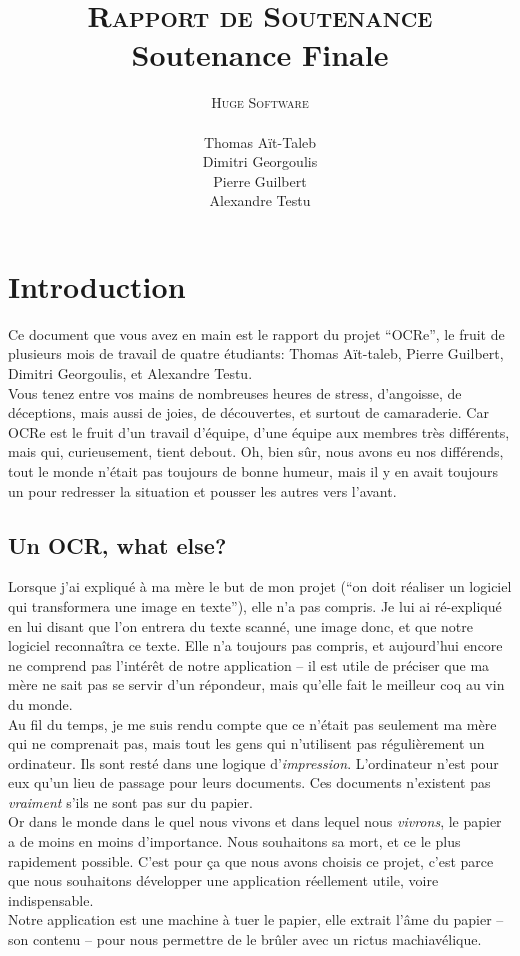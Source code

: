 \documentclass[a4paper,12pt]{report}
\title{\textsc{Rapport de Soutenance} \\ Soutenance Finale}
\author{\textsc{Huge Software}\\ \\ Thomas A\"it-Taleb \\ Dimitri Georgoulis \\ Pierre Guilbert \\ Alexandre Testu}
\date{}
\begin{document}
\lstset{language=C}
\dominitoc
\maketitle
\tableofcontents \pagebreak
\thispagestyle{fancy}

\chapter{Introduction} %
\label{cha:introduction}

Ce document que vous avez en main est le rapport du projet ``OCRe'', le fruit de plusieurs mois de travail de quatre étudiants: Thomas Aït-taleb, Pierre Guilbert, Dimitri Georgoulis, et Alexandre Testu. \\
Vous tenez entre vos mains de nombreuses heures de stress, d’angoisse, de déceptions, mais aussi de joies, de découvertes, et surtout de camaraderie. Car OCRe est le fruit d’un travail d’équipe, d’une équipe aux membres très différents, mais qui, curieusement, tient debout. Oh, bien sûr, nous avons eu nos différends, tout le monde n’était pas toujours de bonne humeur, mais il y en avait toujours un pour redresser la situation et pousser les autres vers l’avant.


\pagebreak

\section{Un OCR, what else?} %
\label{sec:un_ocr_what_else_}
Lorsque j’ai expliqué à ma mère le but de mon projet (``on doit réaliser un logiciel qui transformera une image en texte''), elle n’a pas compris. Je lui ai ré-expliqué en lui disant que l’on entrera du texte scanné, une image donc, et que notre logiciel reconnaîtra ce texte. Elle n’a toujours pas compris, et aujourd’hui encore ne comprend pas l’intérêt de notre application – il est utile de préciser que ma mère ne sait pas se servir d’un répondeur, mais qu’elle fait le meilleur coq au vin du monde. \\
Au fil du temps, je me suis rendu compte que ce n’était pas seulement ma mère qui ne comprenait pas, mais tout les gens qui n’utilisent pas régulièrement un ordinateur. Ils sont resté dans une logique d’\emph{impression}. L’ordinateur n’est pour eux qu’un lieu de passage pour leurs documents. Ces documents n’existent pas \emph{vraiment} s’ils ne sont pas sur du papier. \\
Or dans le monde dans le quel nous vivons et dans lequel nous \emph{vivrons}, le papier a de moins en moins d’importance. Nous souhaitons sa mort, et ce le plus rapidement possible. C’est pour ça que nous avons choisis ce projet, c’est parce que nous souhaitons développer une application réellement utile, voire indispensable. \\
Notre application est une machine à tuer le papier, elle extrait l’âme du papier – son contenu – pour nous permettre de le brûler avec un rictus machiavélique. \\
\end{document}
